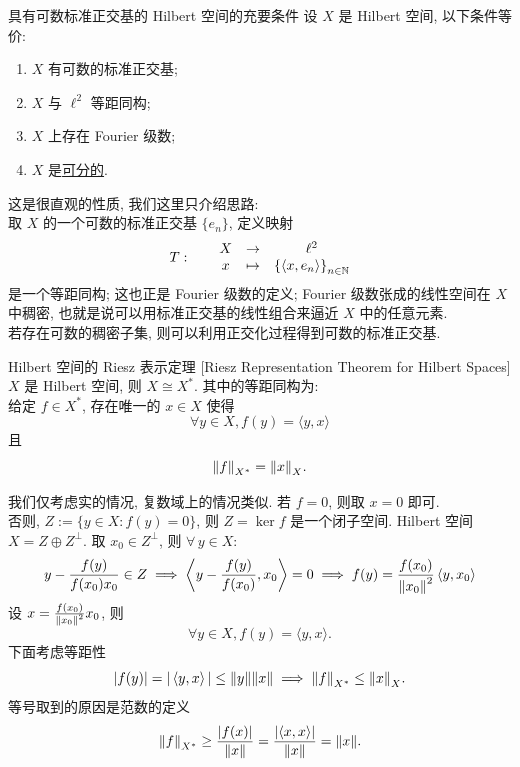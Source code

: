         \begin{thm}
            {具有可数标准正交基的 Hilbert 空间的充要条件}
            设 \(X\) 是 Hilbert 空间, 以下条件等价:
            \begin{enumerate}
                \item \(X\) 有可数的标准正交基;
                \item \(X\) 与 \(\ell^2\) 等距同构;
                \item \(X\) 上存在 Fourier 级数;
                \item \(X\) 是\hyperref[dfn:separable]{可分的}.
            \end{enumerate}
        \end{thm}

        \begin{prf}
            这是很直观的性质, 我们这里只介绍思路:\\
            取 \(X\) 的一个可数的标准正交基 \(\{e_n\}\), 定义映射
            \[T:\qquad\begin{matrix}
                X & \to & \ell^2 \\
                x & \mapsto & \qty{\langle x, e_n\rangle}_{n\in\mathbb{N}}
            \end{matrix}\]
            是一个等距同构; 这也正是 Fourier 级数的定义; Fourier 级数张成的线性空间在 \(X\) 中稠密, 也就是说可以用标准正交基的线性组合来逼近 \(X\) 中的任意元素.\\
            若存在可数的稠密子集, 则可以利用正交化过程得到可数的标准正交基.
        \end{prf}

        \begin{thm}
            {Hilbert 空间的 Riesz 表示定理}
            [Riesz Representation Theorem for Hilbert Spaces]
            \(X\) 是 Hilbert 空间, 则 \(X\cong X^*\). 其中的等距同构为:\\
            给定 \(f\in X^*\), 存在唯一的 \(x\in X\) 使得
            \[\forall y\in X, f(y)=\langle y,x\rangle\]
            且
            \[\norm{f}_{X^*}=\norm{x}_X.\]
        \end{thm}

        \begin{prf}
            我们仅考虑实的情况, 复数域上的情况类似.
            若 \(f=0\), 则取 \(x=0\) 即可. \\
            否则, \(Z:=\{y\in X: f(y)=0\}\), 则 \(Z=\ker f\) 是一个闭子空间. Hilbert 空间 \(X=Z\oplus Z^\perp\). 取 \(x_0\in Z^\perp\), 则 \(\forall\,y\in X\):
            \[y-\frac{f(y)}{f(x_0)x_0}\in Z\implies\left\langle y-\frac{f(y)}{f(x_0)}, x_0\right\rangle =0\implies f(y)=\frac{f(x_0)}{\norm{x_0}^2}\left\langle y,x_0\right\rangle  \]
            设 \(x=\frac{f(x_0)}{\norm{x_0}^2}x_0\), 则
            \[\forall y\in X, f(y)=\langle y,x\rangle.\]
            下面考虑等距性
            \[|f(y)|=|\left\langle y,x\right\rangle|\leq\norm{y}\norm{x} \implies \norm{f}_{X^*}\leq\norm{x}_X.\]
            等号取到的原因是范数的定义
            \[\norm{f}_{X^*}\geq\frac{|f(x)|}{\norm{x}}=\frac{|\langle x,x\rangle|}{\norm{x}}=\norm{x}.\]
        \end{prf}

